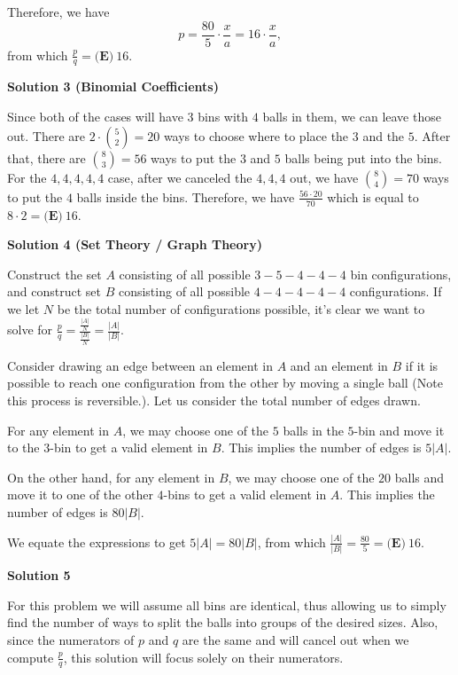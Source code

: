 \begin{enumerate}
 Therefore, we have 
 \[p = \frac{80}{5}\cdot\frac{x}{a} = 16\cdot\frac{x}{a},\] from which $\frac{p}{q} = \boxed{\textbf{(E)}\ 16}.$




\textbf{Solution 3 (Binomial Coefficients)}

Since both of the cases will have $3$ bins with $4$ balls in them, we can leave those out. There are $2 \cdot \binom {5}{2} = 20$ ways to choose where to place the $3$ and the $5$. After that, there are $\binom {8}{3} = 56$ ways to put the $3$ and $5$ balls being put into the bins. For the $4,4,4,4,4$ case, after we canceled the $4,4,4$ out, we have $\binom {8}{4} = 70$ ways to put the $4$ balls inside the bins. Therefore, we have $\frac {56\cdot 20}{70}$ which is equal to $8 \cdot 2 = \boxed{\textbf{(E)}\ 16}$.

 



\textbf{Solution 4 (Set Theory / Graph Theory)}

Construct the set $A$ consisting of all possible $3{-}5{-}4{-}4{-}4$ bin configurations, and construct set $B$ consisting of all possible $4{-}4{-}4{-}4{-}4$ configurations. If we let $N$ be the total number of configurations possible, it's clear we want to solve for $\frac{p}{q} = \frac{\frac{|A|}{N}}{\frac{|B|}{N}} = \frac{|A|}{|B|}$. 

 Consider drawing an edge between an element in $A$ and an element in $B$ if it is possible to reach one configuration from the other by moving a single ball (Note this process is reversible.). Let us consider the total number of edges drawn.

 For any element in $A$, we may choose one of the $5$ balls in the $5$-bin and move it to the $3$-bin to get a valid element in $B$. This implies the number of edges is $5|A|$. 

 On the other hand, for any element in $B$, we may choose one of the $20$ balls and move it to one of the other $4$-bins to get a valid element in $A$. This implies the number of edges is $80|B|$.

 We equate the expressions to get $5|A| = 80|B|$, from which $\frac{|A|}{|B|} = \frac{80}{5} = \boxed{\textbf{(E)}\ 16}$.

 



\textbf{Solution 5}

For this problem we will assume all bins are identical, thus allowing us to simply find the number of ways to split the balls into groups of the desired sizes. Also, since the numerators of $p$ and $q$ are the same and will cancel out when we compute $\frac{p}{q}$, this solution will focus solely on their numerators.


\end{enumerate}
